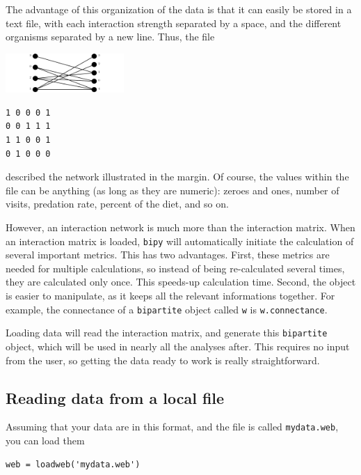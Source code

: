 \documentclass[nols,b5paper]{tufte-book}
\begin{document}
The advantage of this organization of the data is that it can easily be stored in a text file, with each interaction strength separated by a space, and the different organisms separated by a new line. Thus, the file

\begin{marginfigure}[3cm]
	\includegraphics[width=4.5cm]{ex-1}
\end{marginfigure}

\begin{verbatim}
1 0 0 0 1
0 0 1 1 1
1 1 0 0 1
0 1 0 0 0
\end{verbatim}

\noindent described the network illustrated in the margin. Of course, the values within the file can be anything (as long as they are numeric): zeroes and ones, number of visits, predation rate, percent of the diet, and so on.

However, an interaction network is much more than the interaction matrix. When an interaction matrix is loaded, \texttt{bipy} will automatically initiate the calculation of several important metrics. This has two advantages. First, these metrics are needed for multiple calculations, so instead of being re-calculated several times, they are calculated only once. This speeds-up calculation time. Second, the object is easier to manipulate, as it keeps all the relevant informations together. For example, the connectance of a \texttt{bipartite} object called \texttt{w} is \texttt{w.connectance}.

Loading data will read the interaction matrix, and generate this \texttt{bipartite} object, which will be used in nearly all the analyses after. This requires no input from the user, so getting the data ready to work is really straightforward.

\subsection{Reading data from a local file}

Assuming that your data are in this format, and the file is called \texttt{mydata.web}, you can load them

\begin{lstlisting}[caption=loading data from a file]
web = loadweb('mydata.web')
\end{lstlisting}
\end{document}

